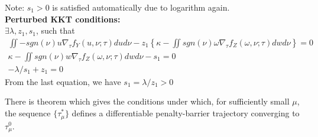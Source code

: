 \documentclass[14pt]{extreport}
\begin{document}
Note: $s_1 > 0$ is satisfied automatically due to logarithm again. \\

\textbf{Perturbed KKT conditions:} \\

$ \exists \lambda ,z_{1},s_{1}$,   such that
\begin{gather*}
\iint -sgn\left( \nu \right) u\nabla_{\tau} f_{Y}\left( u,\nu ;\tau \right) dud\nu -z_{1}\left\{ \kappa - \iint sgn\left( \nu \right) \omega \nabla _{\tau }f_{Z}\left( \omega ,\nu ;\tau \right) dwd\nu\right\} =0 \\
\kappa -\iint sgn\left( \nu \right) w\nabla _{\tau }f_{Z}\left( \omega ,\nu ;\tau \right) dwd\nu -s_{1}=0\\
-\lambda /s_{1}+z_{1}=0
 \end{gather*}
From the last equation, we have $s_1 = \lambda / z_1 > 0$





There is theorem which gives the conditions under which, for sufficiently small $\mu$, the sequence $\{\tau_{\mu}^*\}$ defines a differentiable penalty-barrier trajectory converging to $\tau_{\mu}^0$.\\
\end{document}
